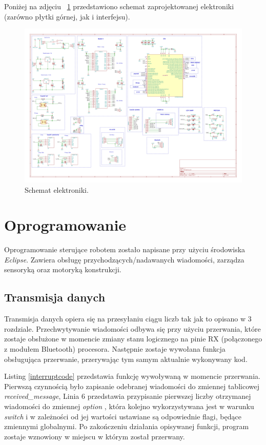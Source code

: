 Poniżej na zdjęciu ~\ref{fig:electric_scheme} przedstawiono schemat zaprojektowanej elektroniki (zarówno płytki górnej, jak i interfejsu).
\begin{landscape}
\begin{figure}[ht]
	\centering
		\includegraphics[width=0.8\linewidth]{pic04/electricscheme.pdf}
	\caption{Schemat elektroniki.}
	\label{fig:electric_scheme}	
\end{figure}
\end{landscape}

\section{Oprogramowanie}
Oprogramowanie sterujące robotem zostało napisane przy użyciu środowiska \textit{Eclipse}. Zawiera obsługę przychodzących/nadawanych wiadomości, zarządza sensoryką oraz motoryką konstrukcji. 

\subsection{Transmisja danych}
Transmisja danych opiera się na przesyłaniu ciągu liczb tak jak to opisano w 3 rozdziale. Przechwytywanie wiadomości odbywa się przy użyciu przerwania, które zostaje obsłużone w momencie zmiany stanu logicznego na pinie RX (połączonego z modułem Bluetooth) procesora. Następnie zostaje wywołana funkcja obsługująca przerwanie, przerywając tym samym aktualnie wykonywany kod. 

Listing \ref{interruptcode} przedstawia funkcję wywoływaną w momencie przerwania. Pierwszą czynnością było zapisanie odebranej wiadomości do zmiennej tablicowej \textit{received\_message},  Linia 6 przedstawia przypisanie pierwszej liczby otrzymanej wiadomości do zmiennej \textit{option} , która kolejno wykorzystywana jest w warunku \textit{switch} i w zależności od jej wartości ustawiane są odpowiednie flagi, będące zmiennymi globalnymi. Po zakończeniu działania opisywanej funkcji, program zostaje wznowiony w miejscu w którym został przerwany. 

